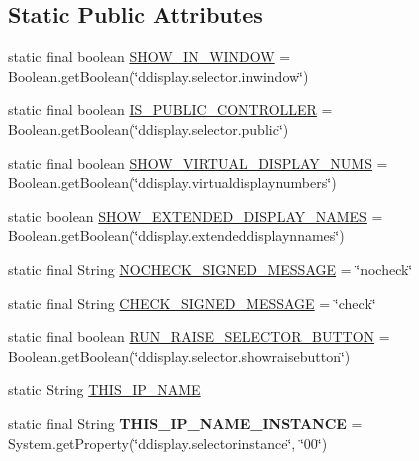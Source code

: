 \subsection*{Static Public Attributes}
\begin{DoxyCompactItemize}
\item 
static final boolean \hyperlink{classgov_1_1fnal_1_1ppd_1_1dd_1_1GlobalVariables_af0e7b37c8bf6495b999b93ed0f4f1c76}{S\-H\-O\-W\-\_\-\-I\-N\-\_\-\-W\-I\-N\-D\-O\-W} = Boolean.\-get\-Boolean(\char`\"{}ddisplay.\-selector.\-inwindow\char`\"{})
\item 
static final boolean \hyperlink{classgov_1_1fnal_1_1ppd_1_1dd_1_1GlobalVariables_a01fec82f5b2996d3e0c41c1f52d884a0}{I\-S\-\_\-\-P\-U\-B\-L\-I\-C\-\_\-\-C\-O\-N\-T\-R\-O\-L\-L\-E\-R} = Boolean.\-get\-Boolean(\char`\"{}ddisplay.\-selector.\-public\char`\"{})
\item 
static final boolean \hyperlink{classgov_1_1fnal_1_1ppd_1_1dd_1_1GlobalVariables_a7ccfa5abda77efe03cd888f14d4171a3}{S\-H\-O\-W\-\_\-\-V\-I\-R\-T\-U\-A\-L\-\_\-\-D\-I\-S\-P\-L\-A\-Y\-\_\-\-N\-U\-M\-S} = Boolean.\-get\-Boolean(\char`\"{}ddisplay.\-virtualdisplaynumbers\char`\"{})
\item 
static boolean \hyperlink{classgov_1_1fnal_1_1ppd_1_1dd_1_1GlobalVariables_a24c624ba470a455c7ed0c43d72a9f417}{S\-H\-O\-W\-\_\-\-E\-X\-T\-E\-N\-D\-E\-D\-\_\-\-D\-I\-S\-P\-L\-A\-Y\-\_\-\-N\-A\-M\-E\-S} = Boolean.\-get\-Boolean(\char`\"{}ddisplay.\-extendeddisplaynnames\char`\"{})
\item 
static final String \hyperlink{classgov_1_1fnal_1_1ppd_1_1dd_1_1GlobalVariables_a83097f18e0ffe08a8a7ae97f883ee471}{N\-O\-C\-H\-E\-C\-K\-\_\-\-S\-I\-G\-N\-E\-D\-\_\-\-M\-E\-S\-S\-A\-G\-E} = \char`\"{}nocheck\char`\"{}
\item 
static final String \hyperlink{classgov_1_1fnal_1_1ppd_1_1dd_1_1GlobalVariables_a274f346ecbec974a9b47db2e5d1e0e8b}{C\-H\-E\-C\-K\-\_\-\-S\-I\-G\-N\-E\-D\-\_\-\-M\-E\-S\-S\-A\-G\-E} = \char`\"{}check\char`\"{}
\item 
static final boolean \hyperlink{classgov_1_1fnal_1_1ppd_1_1dd_1_1GlobalVariables_ab3d08672e81ebb3ed3cea10a5fcaf914}{R\-U\-N\-\_\-\-R\-A\-I\-S\-E\-\_\-\-S\-E\-L\-E\-C\-T\-O\-R\-\_\-\-B\-U\-T\-T\-O\-N} = Boolean.\-get\-Boolean(\char`\"{}ddisplay.\-selector.\-showraisebutton\char`\"{})
\item 
static String \hyperlink{classgov_1_1fnal_1_1ppd_1_1dd_1_1GlobalVariables_a35adf140ccbaaf275e34d1539424828a}{T\-H\-I\-S\-\_\-\-I\-P\-\_\-\-N\-A\-M\-E}
\item 
\hypertarget{classgov_1_1fnal_1_1ppd_1_1dd_1_1GlobalVariables_ae5fe9c75fedaa742e5f68baad8768d7f}{static final String {\bfseries T\-H\-I\-S\-\_\-\-I\-P\-\_\-\-N\-A\-M\-E\-\_\-\-I\-N\-S\-T\-A\-N\-C\-E} = System.\-get\-Property(\char`\"{}ddisplay.\-selectorinstance\char`\"{}, \char`\"{}00\char`\"{})}\label{classgov_1_1fnal_1_1ppd_1_1dd_1_1GlobalVariables_ae5fe9c75fedaa742e5f68baad8768d7f}


\end{DoxyCompactItemize}

